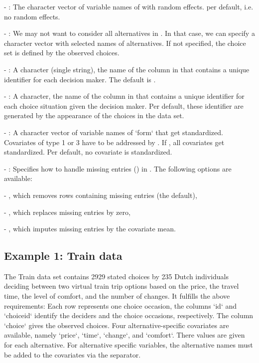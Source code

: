 \documentclass[article]{jss}
\begin{document}
- : The character vector of variable names of  with random effects.  per default, i.e. no random effects.

- : We may not want to consider all alternatives in . In that case, we can specify a character vector  with selected names of alternatives. If not specified, the choice set is defined by the observed choices.

- : A character (single string), the name of the column in  that contains a unique identifier for each decision maker. The default is .

- : A character, the name of the column in  that contains a unique identifier for each choice situation given the decision maker. Per default, these identifier are generated by the appearance of the choices in the data set.

- : A character vector of variable names of `form` that get standardized. Covariates of type 1 or 3 have to be addressed by . If , all covariates get standardized. Per default, no covariate is standardized.

- : Specifies how to handle missing entries () in . The following options are available:

  - , which removes rows containing missing entries (the default),

  - , which replaces missing entries by zero,

  - , which imputes missing entries by the covariate mean.

\subsection{Example 1: Train data} \label{subsec:train_data_prep}

The Train data set contains 2929 stated choices by 235 Dutch individuals deciding between two virtual train trip options based on the price, the travel time, the level of comfort, and the number of changes. It fulfills the above requirements: Each row represents one choice occasion, the columns `id` and `choiceid` identify the deciders and the choice occasions, respectively. The column `choice` gives the observed choices. Four alternative-specific covariates are available, namely `price`, `time`, `change`, and `comfort`. There values are given for each alternative. For alternative specific variables, the alternative names must be added to the covariates via the \code{\_} separator.
\end{document}
